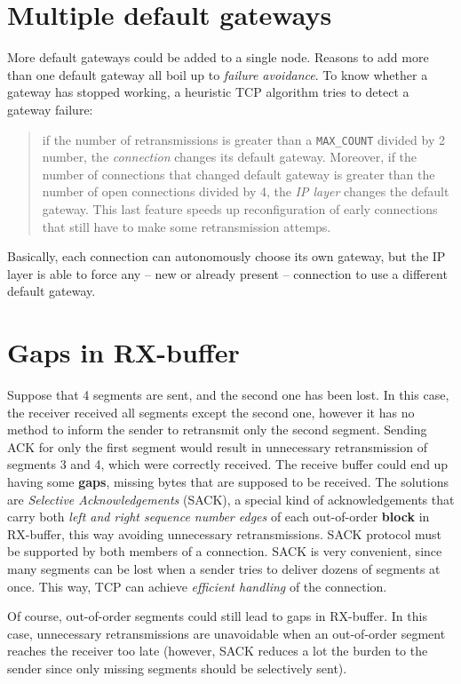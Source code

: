 \documentclass[a4paper, 11pt]{report}
\begin{document}
\section{Multiple default gateways}

More default gateways could be added to a single node. Reasons to add more than
one default gateway all boil up to \emph{failure avoidance}. To know whether a
gateway has stopped working, a heuristic TCP algorithm tries to detect a gateway failure:

\begin{quote}
	if the number of retransmissions is greater than a \texttt{MAX\_COUNT}
	divided by 2 number, the \emph{connection} changes its default gateway.
	Moreover, if the number of connections that changed default gateway is
	greater than the number of open connections divided by 4, the \emph{IP
	layer} changes the default gateway. This last feature speeds up
	reconfiguration of early connections that still have to make some
	retransmission attemps.
\end{quote}

Basically, each connection can autonomously choose its own gateway, but the IP
layer is able to force any \--- new or already present \--- connection to use a
different default gateway.

\section{Gaps in RX-buffer}

Suppose that 4 segments are sent, and the second one has been lost. In this
case, the receiver received all segments except the second one, however it has
no method to inform the sender to retransmit only the second segment. Sending
ACK for only the first segment would result in unnecessary retransmission of
segments 3 and 4, which were correctly received. The receive buffer could end
up having some \textbf{gaps}, missing bytes that are supposed to be received.
The solutions are \emph{Selective Acknowledgements} (SACK), a special kind of
acknowledgements that carry both \emph{left and right sequence number edges} of
each out-of-order \textbf{block} in RX-buffer, this way avoiding unnecessary
retransmissions. SACK protocol must be supported by both members of a
connection. SACK is very convenient, since many segments can be lost when a
sender tries to deliver dozens of segments at once. This way, TCP can achieve
\emph{efficient handling} of the connection.

Of course, out-of-order segments could still lead to gaps in RX-buffer. In this
case, unnecessary retransmissions are unavoidable when an out-of-order segment
reaches the receiver too late (however, SACK reduces a lot the burden to the
sender since only missing segments should be selectively sent).
\end{document}
